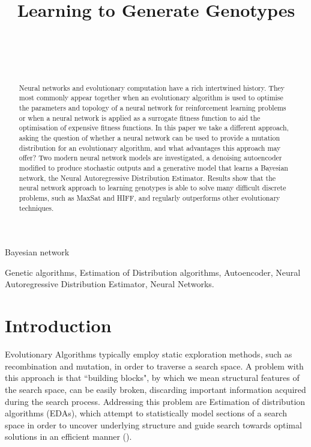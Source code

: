 \documentclass[twoside]{article}
\begin{document}
\title{\bf Learning to Generate Genotypes}  

\author{ \hfill {}\\ 
\AND
        \hfill {}\\
\AND
        \hfill {}\\
}Bayesian network

\maketitle

\begin{abstract}

Neural networks and evolutionary computation have a rich intertwined history. They most commonly appear together when an evolutionary algorithm is used to optimise the parameters and topology of a neural network for reinforcement learning problems or when a neural network is applied as a surrogate fitness function to aid the optimisation of expensive fitness functions. In this paper we take a different approach, asking the question of whether a neural network can be used to provide a mutation distribution for an evolutionary algorithm, and what advantages this approach may offer? Two modern neural network models are investigated, a denoising autoencoder modified to produce stochastic outputs and a generative model that learns a Bayesian network, the Neural Autoregressive Distribution Estimator. Results show that the neural network approach to learning genotypes is able to solve many difficult discrete problems, such as MaxSat and HIFF, and regularly outperforms other evolutionary techniques.

\end{abstract}

\begin{keywords}

Genetic algorithms, 
Estimation of Distribution algorithms,
Autoencoder,
Neural Autoregressive Distribution Estimator,
Neural Networks.

\end{keywords}
\section{Introduction}
Evolutionary Algorithms typically employ static exploration methods, such as recombination and mutation, in order to traverse a search space. A problem with this approach is that ``building blocks", by which we mean structural features of the search space, can be easily broken, discarding important information acquired during the search process. Addressing this problem are Estimation of distribution algorithms (EDAs), which attempt to statistically model sections of a search space in order to uncover underlying structure and guide search towards optimal solutions in an efficient manner (\cite{pelikan2006scalable}).
\end{document}
